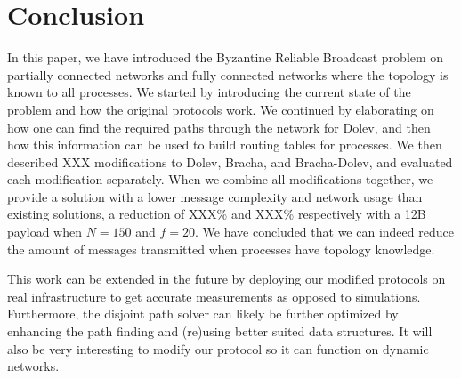 \section{Conclusion}
\label{conclusion}


In this paper, we have introduced the Byzantine Reliable Broadcast problem on partially connected networks and fully connected networks where the topology is known to all processes. We started by introducing the current state of the problem and how the original protocols work. We continued by elaborating on how one can find the required paths through the network for Dolev, and then how this information can be used to build routing tables for processes. We then described XXX modifications to Dolev, Bracha, and Bracha-Dolev, and evaluated each modification separately. When we combine all modifications together, we provide a solution with a lower message complexity and network usage than existing solutions, a reduction of XXX\% and XXX\% respectively with a 12B payload when $N=150$ and $f=20$.
We have concluded that we can indeed reduce the amount of messages transmitted when processes have topology knowledge.

This work can be extended in the future by deploying our modified protocols on real infrastructure to get accurate measurements as opposed to simulations. Furthermore, the disjoint path solver can likely be further optimized by enhancing the path finding and (re)using better suited data structures. It will also be very interesting to modify our protocol so it can function on dynamic networks.
